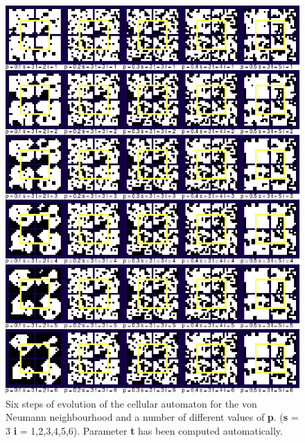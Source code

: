 \documentclass[a4paper, 11pt]{article} %
\begin{document}
\begin{figure}[ht]
	\centering
	\includegraphics[width=1.\textwidth]{neumann_i}
	\caption{Six steps of evolution of the cellular automaton for the von Neumann neighbourhood and a number of different values of \textbf{p}. (\textbf{s} = 3 \textbf{i} = 1,2,3,4,5,6). Parameter \textbf{t} has been computed automatically.}
	\label{fig:results2}
\end{figure}
\end{document}
